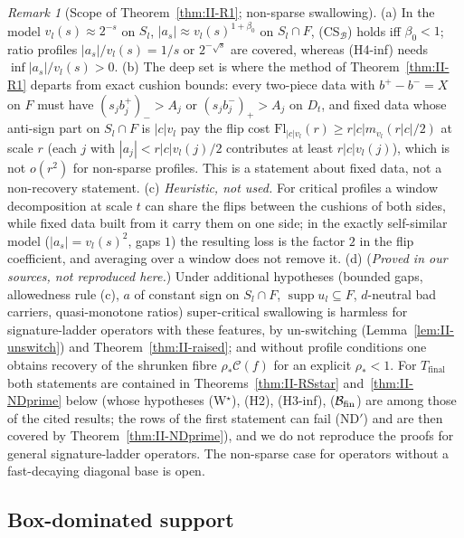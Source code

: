 \documentclass[10pt]{amsart}
\theoremstyle{definition}
\theoremstyle{remark}
\newtheorem{remark}[theorem]{Remark}
\newcommand{\supp}{\operatorname{supp}}
\newcommand{\Cset}{\mathcal C}
\begin{document}
\begin{remark}[Scope of Theorem~\ref{thm:II-R1}; non-sparse swallowing]
\label{rem:II-R1}
(a) In the model $v_l(s)\approx2^{-s}$ on $S_l$, $|a_s|\approx v_l(s)^{1+\beta_0}$
on $S_l\cap F$, (CS$_{\mathcal B}$) holds iff $\beta_0<1$; ratio profiles
$|a_s|/v_l(s)=1/s$ or $2^{-\sqrt s}$ are covered, whereas (H4-inf) needs
$\inf|a_s|/v_l(s)>0$.
(b) The deep set is where the method of Theorem~\ref{thm:II-R1} departs
from exact cushion bounds: every two-piece data with $b^+-b^-=X$ on $F$
must have $(s_jb^+_j)_->A_j$ or $(s_jb^-_j)_+>A_j$ on $D_t$, and fixed
data whose anti-sign part on $S_l\cap F$ is $|c|v_l$ pay the flip cost
$\mathrm{Fl}_{|c|v_l}(r)\ge r|c|m_{v_l}(r|c|/2)$ at scale $r$ (each $j$ with
$|a_j|<r|c|v_l(j)/2$ contributes at least $r|c|v_l(j)$), which is not
$o(r^2)$ for non-sparse profiles.  This is a statement about fixed data,
not a non-recovery statement.
(c) \emph{Heuristic, not used.}  For critical profiles a window
decomposition at scale $t$ can share the flips between the cushions of both
sides, while fixed data built from it carry them on one side; in the exactly
self-similar model ($|a_s|=v_l(s)^2$, gaps $1$) the resulting loss is the
factor $2$ in the flip coefficient, and averaging over a window does not
remove it.
(d) (\emph{Proved in our sources, not reproduced here.})  Under additional
hypotheses (bounded gaps, allowedness rule (c), $a$
of constant sign on $S_l\cap F$, $\supp u_l\subseteq F$, $d$-neutral bad
carriers, quasi-monotone ratios) super-critical swallowing is harmless for
signature-ladder operators with these features, by un-switching
(Lemma~\ref{lem:II-unswitch}) and Theorem~\ref{thm:II-raised}; and without
profile conditions one obtains recovery of the shrunken fibre $\rho_*\Cset(f)$
for an explicit $\rho_*<1$.  For $T_{\mathrm{final}}$ both statements are
contained in Theorems~\ref{thm:II-RSstar} and~\ref{thm:II-NDprime} below
(whose hypotheses (W$^\star$), (H2), (H3-inf), ($\mathcal B_{\rm fin}$) are
among those of the cited results; the rows of the first statement can fail
(ND$'$) and are then covered by Theorem~\ref{thm:II-NDprime}), and we do not
reproduce the proofs for general signature-ladder operators.  The non-sparse case for operators without a fast-decaying
diagonal base is open.
\end{remark}

\subsection{Box-dominated support}\label{subsec:II-N}
\end{document}
